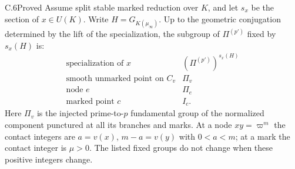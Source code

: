 \begin{claim}{C.6}{Proved}
Assume split stable marked reduction over $K$, and let $s_x$ be the section
of $x\in U(K)$. Write $H=G_{K(\mu_\infty)}$. Up to the geometric
conjugation determined by the lift of the specialization, the subgroup of
$\Pi^{(p')}$ fixed by $s_x(H)$ is:
\[
\begin{array}{c|c}
\text{specialization of }x& (\Pi^{(p')})^{s_x(H)}\\\hline
\text{smooth unmarked point on }C_v&\Pi_v\\
\text{node }e&\Pi_e\\
\text{marked point }c&I_c.
\end{array}
\]
Here $\Pi_v$ is the injected prime-to-$p$ fundamental group of the
normalized component punctured at all its branches and marks. At a node
$xy=\varpi^m$ the contact integers are $a=v(x)$, $m-a=v(y)$ with
$0<a<m$; at a mark the contact integer is $\mu>0$. The listed fixed
groups do not change when these positive integers change.
\end{claim}
